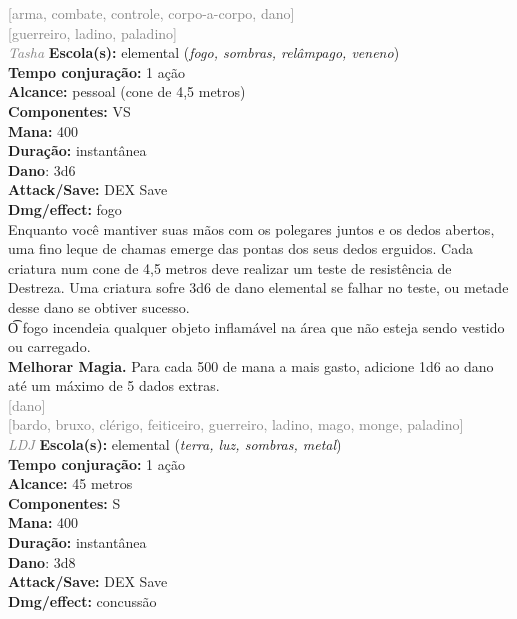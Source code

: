 \documentclass{RPG_Adventure}[2021/10/20]
\begin{document}
{\scriptsize \textcolor{gray}{[arma, combate, controle, corpo-a-corpo, dano]\\}}
{\scriptsize \textcolor{gray}{[guerreiro, ladino, paladino]\\}}
{\tiny \textcolor{gray}{\textit{Tasha}}}
{\small \t \textbf{Escola(s):} elemental (\textit{fogo, sombras, relâmpago, veneno})\\\t \textbf{Tempo conjuração:} 1 ação\\\t \textbf{Alcance:} pessoal (cone de 4,5 metros)\\\t \textbf{Componentes:} VS\\\t \textbf{Mana:} 400\\\t \textbf{Duração:} instantânea\\\t \textbf{Dano}: 3d6\\\t \textbf{Attack/Save:} DEX Save\\\t \textbf{Dmg/effect:} fogo\\}
{\normalsize Enquanto você mantiver suas mãos com os polegares juntos e os dedos abertos, uma fino leque de chamas emerge das pontas dos seus dedos erguidos. Cada criatura num cone de 4,5 metros deve realizar um teste de resistência de Destreza. Uma criatura sofre 3d6 de dano elemental se falhar no teste, ou metade desse dano se obtiver sucesso.\\\t O fogo incendeia qualquer objeto inflamável na área que não esteja sendo vestido ou carregado.\\\t \textbf{Melhorar Magia.} Para cada 500 de mana a mais gasto, adicione 1d6 ao dano até um máximo de 5 dados extras.\\}
{\scriptsize \textcolor{gray}{[dano]\\}}
{\scriptsize \textcolor{gray}{[bardo, bruxo, clérigo, feiticeiro, guerreiro, ladino, mago, monge, paladino]\\}}
{\tiny \textcolor{gray}{\textit{LDJ}}}
{\small \t \textbf{Escola(s):} elemental (\textit{terra, luz, sombras, metal})\\\t \textbf{Tempo conjuração:} 1 ação\\\t \textbf{Alcance:} 45 metros\\\t \textbf{Componentes:} S\\\t \textbf{Mana:} 400\\\t \textbf{Duração:} instantânea\\\t \textbf{Dano}: 3d8\\\t \textbf{Attack/Save:} DEX Save\\\t \textbf{Dmg/effect:} concussão\\}
\end{document}
